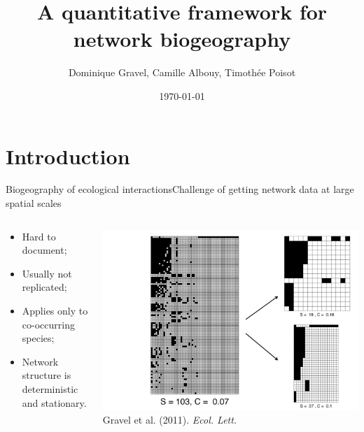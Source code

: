 \documentclass{eecslides}
\title[Network biogeography]{A quantitative framework for network biogeography}
\author[D. Gravel]{Dominique Gravel, Camille Albouy, Timothée Poisot}
\institute{UQAR -- Canada Research Chair in Ecosystem ecology}
\date{\today}
\begin{document}
	\begin{frame}[plain]
		\titlepage
	\end{frame}


	\section{Introduction}


	\begin{frame}{Biogeography of ecological interactions}{Challenge of getting network data at large spatial scales}
 	    	\begin{columns}
			\begin{column}{0.35\textwidth}			
				\begin{itemize}
					\item Hard to document;
					\item Usually not replicated;
					\item Applies only to co-occurring species;
					\item Network structure is deterministic and stationary.
				\end{itemize}
			\end{column}
			\begin{column}{0.65\textwidth}
				\begin{center}
					\includegraphics[height=0.55\textheight]{havens_sampling}\\
					\footnotesize{Gravel et al. (2011). \textit{Ecol. Lett.}}
				\end{center}
			\end{column}				
		\end{columns}	   
	\end{frame}
\end{document}
